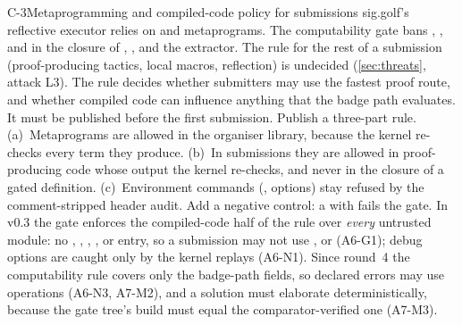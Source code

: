\begin{issue}{C-3}{Metaprogramming and compiled-code policy for submissions}
\IRprob sig.golf's reflective executor relies on  and 
metaprograms. The computability gate bans , ,
 and  in the closure of , ,  and the
extractor. The rule for the rest of a submission (proof-producing tactics, local macros, reflection)
is undecided (\cref{sec:threats}, attack L3).
\IRwhy The rule decides whether submitters may use the fastest proof route, and whether compiled
code can influence anything that the badge path evaluates. It must be published before the first
submission.
\IRres Publish a three-part rule. (a)~Metaprograms are allowed in the organiser library, because the
kernel re-checks every term they produce. (b)~In submissions they are allowed in proof-producing
code whose output the kernel re-checks, and never in the closure of a gated definition.
(c)~Environment commands (,  options) stay refused by the
comment-stripped header audit. Add a negative control: a  with 
fails the gate.
In v0.3 the gate enforces the compiled-code half of the rule over \emph{every} untrusted module:
no , , , ,  or
 entry, so a submission may not use ,  or
 (A6-G1); debug options are caught only by the kernel replays (A6-N1). Since
round~4 the computability rule covers only the badge-path fields, so declared errors may use
 operations (A6-N3, A7-M2), and a solution must elaborate deterministically, because the
gate tree's build must equal the comparator-verified one (A7-M3).
\end{issue}

